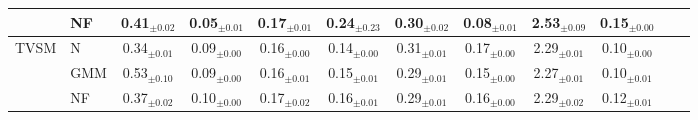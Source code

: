 \begin{table}[t]
\begin{center}
\begin{small}
\begin{sc}
\begin{tabular}{llcccccccccc}
                             & NF  & 0.41$_{\pm 0.02}$ & 0.05$_{\pm 0.01}$ & 0.17$_{\pm 0.01}$ & 0.24$_{\pm 0.23}$ & 0.30$_{\pm 0.02}$ & 0.08$_{\pm 0.01}$ & 2.53$_{\pm 0.09}$ & 0.15$_{\pm 0.00}$ \\
\midrule
\multirow{3}{*}{TVSM} & N   & 0.34$_{\pm 0.01}$ & 0.09$_{\pm 0.00}$ & 0.16$_{\pm 0.00}$ & 0.14$_{\pm 0.00}$ & 0.31$_{\pm 0.01}$ & 0.17$_{\pm 0.00}$ & 2.29$_{\pm 0.01}$ & 0.10$_{\pm 0.00}$ \\
                             & GMM & 0.53$_{\pm 0.10}$ & 0.09$_{\pm 0.00}$ & 0.16$_{\pm 0.01}$ & 0.15$_{\pm 0.01}$ & 0.29$_{\pm 0.01}$ & 0.15$_{\pm 0.00}$ & 2.27$_{\pm 0.01}$ & 0.10$_{\pm 0.01}$ \\
                             & NF  & 0.37$_{\pm 0.02}$ & 0.10$_{\pm 0.00}$ & 0.17$_{\pm 0.02}$ & 0.16$_{\pm 0.01}$ & 0.29$_{\pm 0.01}$ & 0.16$_{\pm 0.00}$ & 2.29$_{\pm 0.02}$ & 0.12$_{\pm 0.01}$ \\
\bottomrule
\end{tabular}
\end{sc}
\end{small}
\end{center}
\vskip -0.1in
\end{table}
